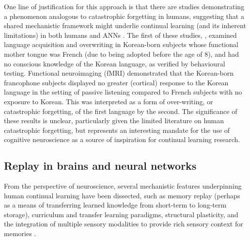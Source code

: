 \documentclass{article} %
\begin{document}
One line of justification for this approach is that there are studies demonstrating a phenomenon analogous to catastrophic forgetting in humans, suggesting that a shared mechanistic framework might underlie continual learning (and its inherent limitations) in both humans and ANNs \citep{pallier2003brain,mareschal2007neuroconstructivism}. The first of these studies, \citet{pallier2003brain}, examined language acquisition and overwriting in Korean-born subjects whose functional mother tongue was French (due to being adopted before the age of 8), and had no conscious knowledge of the Korean language, as verified by behavioural testing. Functional neuroimaging (fMRI) demonstrated that the Korean-born francophone subjects displayed no greater (cortical) response to the Korean language in the setting of passive listening compared to French subjects with no exposure to Korean. This was interpreted as a form of over-writing, or catastrophic forgetting, of the first language by the second. The significance of these results is unclear, particularly given the limited literature on human catastrophic forgetting, but represents an interesting mandate for the use of cognitive neuroscience as a source of inspiration for continual learning research.

\subsection*{Replay in brains and neural networks}

From the perspective of neuroscience, several mechanistic features underpinning human continual learning have been dissected, such as memory replay (perhaps as a means of transferring learned knowledge from short-term to long-term storage), curriculum and transfer learning paradigms, structural plasticity, and the integration of multiple sensory modalities to provide rich sensory context for memories \citep{parisi2019continual}.
\end{document}

